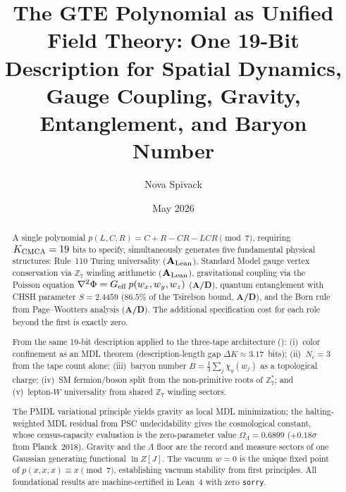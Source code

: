 \documentclass[11pt]{article}
\theoremstyle{remark}
\newcommand{\ZS}{\mathbb{Z}_7}
\newcommand{\ZSstar}{\mathbb{Z}_7^*}
\newcommand{\OmegaL}{\Omega_\Lambda}
\newcommand{\CatAL}{\ensuremath{\textbf{A}_{\rm Lean}}}
\newcommand{\CatAD}{\textbf{A/D}}
\begin{document}
\title{\textbf{The GTE Polynomial as Unified Field Theory:
  One 19-Bit Description for Spatial Dynamics, Gauge Coupling,
  Gravity, Entanglement, and Baryon Number}}

\author{Nova Spivack}
\date{May 2026}
\maketitle

\NovaZenodoAfterTitle

\begin{abstract}
A single polynomial $p(L,C,R) = C + R - CR - LCR \pmod{7}$, requiring
$K_{\rm CMCA} = 19$ bits to specify, simultaneously generates five fundamental
physical structures: Rule~110 Turing universality (\CatAL), Standard Model gauge
vertex conservation via $\ZS$ winding arithmetic (\CatAL), gravitational coupling via
the Poisson equation $\nabla^2\Phi = G_{\rm eff}\,p(w_x,w_y,w_z)$ (\CatAD),
quantum entanglement with CHSH parameter $S = 2.4459$ ($86.5\%$ of the Tsirelson
bound, \CatAD), and the Born rule from Page--Wootters analysis (\CatAD).
The additional specification cost for each role beyond the first is exactly zero.

From the same 19-bit description applied to the three-tape architecture (\cite{SpivackThreeTapeCMCA}):
(i)~color confinement as an MDL theorem (description-length gap $\Delta K \approx 3.17$~bits);
(ii)~$N_c = 3$ from the tape count alone;
(iii)~baryon number $B = \tfrac{1}{3}\sum_j \chi_q(w_j)$ as a topological charge;
(iv)~SM fermion/boson split from the non-primitive roots of $\ZSstar$; and
(v)~lepton-$W$ universality from shared $\ZS$ winding sectors.

The PMDL variational principle yields gravity as local MDL minimization; the
halting-weighted MDL residual from PSC undecidability gives the cosmological
constant, whose census-capacity evaluation is the zero-parameter value
$\OmegaL = 0.6899$ ($+0.18\sigma$ from Planck~2018).  Gravity and the $\Lambda$
floor are the record and measure sectors of one Gaussian generating functional
$\ln Z[J]$.
The vacuum $w = 0$ is the unique fixed point of $p(x,x,x) \equiv x \pmod{7}$,
establishing vacuum stability from first principles.
All foundational results are machine-certified in Lean~4 with zero \texttt{sorry}.
\end{abstract}

\tableofcontents
\newpage
\end{document}
